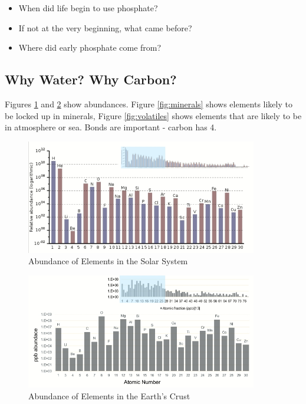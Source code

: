 \documentclass[]{article}
\begin{document}
\begin{itemize}
	\item When did life begin to use 	phosphate?
	\item If not at the very beginning, what 	came before?
	\item Where did early phosphate come 	from?
\end{itemize}

\subsection{Why Water? Why Carbon?}
Figures \ref{fig:abundances1} and \ref{fig:abundances2} show abundances. Figure \ref{fig:minerals} shows elements likely to be locked up in minerals, Figure \ref{fig:volatiles} shows elements that are likely to be in atmosphere or sea. Bonds are important - carbon has 4.

\begin{figure}[H]
	\caption{Abundance of Elements in the Solar System}\label{fig:abundances1} 
	\includegraphics[width=0.9\textwidth]{Abundances}
\end{figure}

\begin{figure}[H]
	\caption{Abundance of Elements in the Earth's Crust}\label{fig:abundances2}  
	\includegraphics[width=0.9\textwidth]{AbundancesEarth}
\end{figure}
\end{document}
